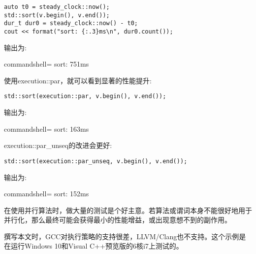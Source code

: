 \begin{lstlisting}[style=styleCXX]
auto t0 = steady_clock::now();
std::sort(v.begin(), v.end());
dur_t dur0 = steady_clock::now() - t0;
cout << format("sort: {:.3}ms\n", dur0.count());
\end{lstlisting}

输出为:

\begin{tcblisting}{commandshell={}}
sort: 751ms
\end{tcblisting}

使用execution::par，就可以看到显著的性能提升:

\begin{lstlisting}[style=styleCXX]
std::sort(execution::par, v.begin(), v.end());
\end{lstlisting}

输出为:

\begin{tcblisting}{commandshell={}}
sort: 163ms
\end{tcblisting}

execution::par\_unseq的改进会更好:

\begin{lstlisting}[style=styleCXX]
std::sort(execution::par_unseq, v.begin(), v.end());
\end{lstlisting}

输出为:

\begin{tcblisting}{commandshell={}}
sort: 152ms
\end{tcblisting}

在使用并行算法时，做大量的测试是个好主意。若算法或谓词本身不能很好地用于并行化，那么最终可能会获得最小的性能增益，或出现意想不到的副作用。

\begin{tcolorbox}[colback=webgreen!5!white,colframe=webgreen!75!black,title=Note]
撰写本文时，GCC对执行策略的支持很差，LLVM/Clang也不支持。这个示例是在运行Windows 10和Visual C++预览版的6核i7上测试的。
\end{tcolorbox}

















